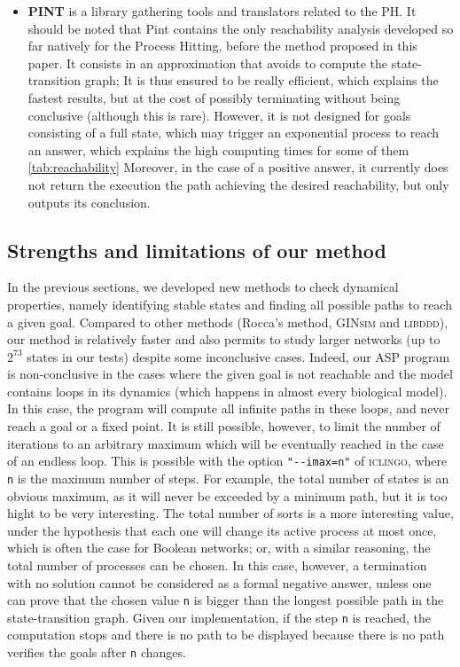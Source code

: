 \begin{itemize}
\item \textbf{PINT}
is a library gathering tools and translators related to the PH.
It should be noted that Pint contains the only reachability analysis
developed so far natively for the Process Hitting,
before the method proposed in this paper.
It consists in an approximation that avoids to compute the state-transition graph;
It is thus ensured to be really efficient, which explains the fastest results,
but at the cost of possibly terminating without being conclusive (although this is rare).
However, it is not designed for goals consisting of a full state, which
may trigger an exponential process to reach an answer,
which explains the high computing times for some of them \ref{tab:reachability}
Moreover, in the case of a positive answer,
it currently does not return the execution the path achieving the desired reachability,
but only outputs its conclusion.
\end{itemize}

\subsection{Strengths and limitations of our method}

In the previous sections,
we developed new methods to check dynamical properties,
namely identifying stable states and finding all possible paths to reach a given goal.
Compared to other methods (Rocca's method, \textsc{GINsim} and \textsc{libddd}),
our method is relatively faster and also permits to study larger networks
(up to $2^{73}$ states in our tests) despite some inconclusive cases.
Indeed, our ASP program is non-conclusive in the cases where the given goal is not
reachable and the model contains loops in its dynamics
(which happens in almost every biological model).
In this case, the program will compute all infinite paths in these loops,
and never reach a goal or a fixed point.
It is still possible, however, to limit the number of iterations to an arbitrary
maximum which will be eventually reached in the case of an endless loop.
This is possible with the option \texttt{"-{}-imax=n"} of \textsc{iclingo},
where \texttt{n} is the maximum number of steps.
For example, the total number of states is an obvious maximum,
as it will never be exceeded by a minimum path,
but it is too hight to be very interesting.
The total number of sorts is a more interesting value,
under the hypothesis that each one will change its active process at most once,
which is often the case for Boolean networks;
or, with a similar reasoning, the total number of processes can be chosen.
In this case, however, a termination with no solution cannot be considered as a formal
negative answer, unless one can prove that the chosen value \texttt{n}
is bigger than the longest possible path in the state-transition graph.
Given our implementation, if the step \texttt{n} is reached,
the computation stops and there is no path to be displayed because there is no path verifies the goals after \texttt{n} changes.
